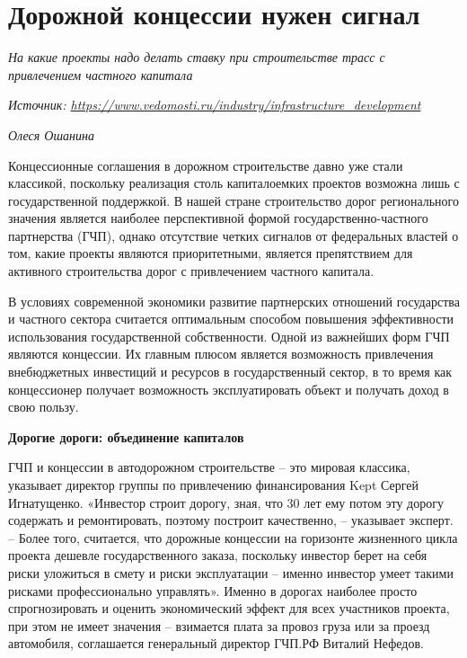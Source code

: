 
\section{Дорожной концессии нужен сигнал}

\textit{На какие проекты надо делать ставку при строительстве трасс с привлечением частного капитала}

\textit{Источник: \url{https://www.vedomosti.ru/industry/infrastructure_development}}

\textit{Олеся Ошанина}

Концессионные соглашения в дорожном строительстве давно уже стали классикой, поскольку реализация столь капиталоемких проектов возможна лишь с государственной поддержкой. В нашей стране строительство дорог регионального значения является наиболее перспективной формой государственно-частного партнерства (ГЧП), однако отсутствие четких сигналов от федеральных властей о том, какие проекты являются приоритетными, является препятствием для активного строительства дорог с привлечением частного капитала.

В условиях современной экономики развитие партнерских отношений государства и частного сектора считается оптимальным способом повышения эффективности использования государственной собственности. Одной из важнейших форм ГЧП являются концессии. Их главным плюсом является возможность привлечения внебюджетных инвестиций и ресурсов в государственный сектор, в то время как концессионер получает возможность эксплуатировать объект и получать доход в свою пользу.

\textbf{Дорогие дороги: объединение капиталов}

ГЧП и концессии в автодорожном строительстве – это мировая классика, указывает директор группы по привлечению финансирования Kept Сергей Игнатущенко. «Инвестор строит дорогу, зная, что 30 лет ему потом эту дорогу содержать и ремонтировать, поэтому построит качественно, – указывает эксперт. – Более того, считается, что дорожные концессии на горизонте жизненного цикла проекта дешевле государственного заказа, поскольку инвестор берет на себя риски уложиться в смету и риски эксплуатации – именно инвестор умеет такими рисками профессионально управлять». Именно в дорогах наиболее просто спрогнозировать и оценить экономический эффект для всех участников проекта, при этом не имеет значения – взимается плата за провоз груза или за проезд автомобиля, соглашается генеральный директор ГЧП.РФ Виталий Нефедов.

